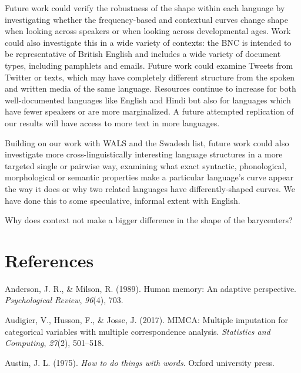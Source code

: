 \documentclass[man,floatsintext]{apa6}
\begin{document}
Future work could verify the robustness of the shape within each language by investigating whether the frequency-based and contextual curves change shape when looking across speakers or when looking across developmental ages. Work could also investigate this in a wide variety of contexts: the BNC is intended to be representative of British English and includes a wide variety of document types, including pamphlets and emails. Future work could examine Tweets from Twitter or texts, which may have completely different structure from the spoken and written media of the same language. Resources continue to increase for both well-documented languages like English and Hindi but also for languages which have fewer speakers or are more marginalized. A future attempted replication of our results will have access to more text in more languages.

Building on our work with WALS and the Swadesh list, future work could also investigate more cross-linguistically interesting language structures in a more targeted single or pairwise way, examining what exact syntactic, phonological, morphological or semantic properties make a particular language's curve appear the way it does or why two related languages have differently-shaped curves. We have done this to some speculative, informal extent with English.

Why does context not make a bigger difference in the shape of the barycenters?

\newpage

\hypertarget{references}{%
\section{References}\label{references}}

\begingroup
\setlength{\parindent}{-0.5in}
\setlength{\leftskip}{0.5in}

\hypertarget{refs}{}
\leavevmode\hypertarget{ref-anderson1989}{}%
Anderson, J. R., \& Milson, R. (1989). Human memory: An adaptive perspective. \emph{Psychological Review}, \emph{96}(4), 703.

\leavevmode\hypertarget{ref-audigier2017}{}%
Audigier, V., Husson, F., \& Josse, J. (2017). MIMCA: Multiple imputation for categorical variables with multiple correspondence analysis. \emph{Statistics and Computing}, \emph{27}(2), 501--518.

\leavevmode\hypertarget{ref-austin1975}{}%
Austin, J. L. (1975). \emph{How to do things with words}. Oxford university press.
\end{document}
